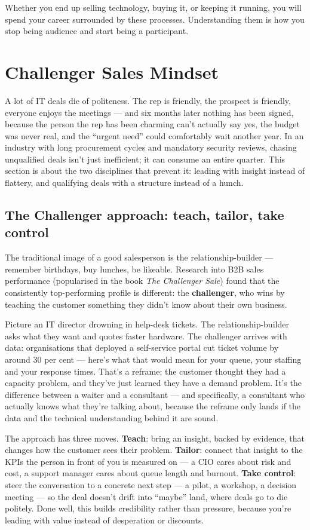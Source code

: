 Whether you end up selling technology, buying it, or keeping it running, you will spend your career surrounded by these processes. Understanding them is how you stop being audience and start being a participant.

\section{Challenger Sales Mindset}
A lot of IT deals die of politeness. The rep is friendly, the prospect is friendly, everyone enjoys the meetings — and six months later nothing has been signed, because the person the rep has been charming can't actually say yes, the budget was never real, and the ``urgent need'' could comfortably wait another year. In an industry with long procurement cycles and mandatory security reviews, chasing unqualified deals isn't just inefficient; it can consume an entire quarter. This section is about the two disciplines that prevent it: leading with insight instead of flattery, and qualifying deals with a structure instead of a hunch.



\subsection{The Challenger approach: teach, tailor, take control}


The traditional image of a good salesperson is the relationship-builder — remember birthdays, buy lunches, be likeable. Research into B2B sales performance (popularised in the book \emph{The Challenger Sale}) found that the consistently top-performing profile is different: the \textbf{challenger}, who wins by teaching the customer something they didn't know about their own business.


Picture an IT director drowning in help-desk tickets. The relationship-builder asks what they want and quotes faster hardware. The challenger arrives with data: organisations that deployed a self-service portal cut ticket volume by around 30 per cent — here's what that would mean for your queue, your staffing and your response times. That's a reframe: the customer thought they had a capacity problem, and they've just learned they have a demand problem. It's the difference between a waiter and a consultant — and specifically, a consultant who actually knows what they're talking about, because the reframe only lands if the data and the technical understanding behind it are sound.


The approach has three moves. \textbf{Teach}: bring an insight, backed by evidence, that changes how the customer sees their problem. \textbf{Tailor}: connect that insight to the KPIs the person in front of you is measured on — a CIO cares about risk and cost, a support manager cares about queue length and burnout. \textbf{Take control}: steer the conversation to a concrete next step — a pilot, a workshop, a decision meeting — so the deal doesn't drift into ``maybe'' land, where deals go to die politely. Done well, this builds credibility rather than pressure, because you're leading with value instead of desperation or discounts.


